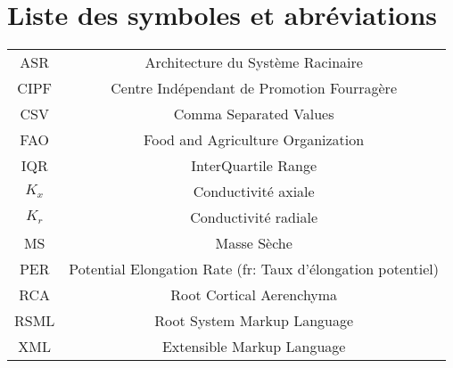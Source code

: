 \newpage
\tableofcontents

\newpage
\listoffigures
{}

\newpage
\listoftables
{}

\newpage
\section*{Liste des symboles et abréviations}

\begin{tabular}{c | c}
ASR & Architecture du Système Racinaire \\
CIPF & Centre Indépendant de Promotion Fourragère \\
CSV & Comma Separated Values \\
FAO & Food and Agriculture Organization \\
IQR & InterQuartile Range \\
$K_{x}$ & Conductivité axiale \\
$K_{r}$ & Conductivité radiale \\
MS & Masse Sèche \\
PER & Potential Elongation Rate (fr: Taux d'élongation potentiel) \\
RCA & Root Cortical Aerenchyma \\
RSML & Root System Markup Language \\
XML & Extensible Markup Language
\end{tabular}

